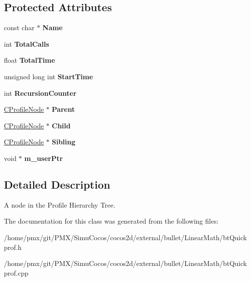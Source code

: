 \subsection*{Protected Attributes}
\begin{DoxyCompactItemize}
\item 
\mbox{\label{classCProfileNode_a1422993bfa989e55ed98d4b1561a127f}} 
const char $\ast$ {\bfseries Name}
\item 
\mbox{\label{classCProfileNode_a2a19e52aa6b96174d010b3c48fccc8cd}} 
int {\bfseries Total\+Calls}
\item 
\mbox{\label{classCProfileNode_a006b92703a98e8c9f238a08749115125}} 
float {\bfseries Total\+Time}
\item 
\mbox{\label{classCProfileNode_a99f6de1d168f7d52a43dac96b43d4cc5}} 
unsigned long int {\bfseries Start\+Time}
\item 
\mbox{\label{classCProfileNode_adf5b1996ba56ff4dfcf3f67549844fa5}} 
int {\bfseries Recursion\+Counter}
\item 
\mbox{\label{classCProfileNode_af23feafd54a172cd1bf933c0f214131b}} 
\hyperlink{classCProfileNode}{C\+Profile\+Node} $\ast$ {\bfseries Parent}
\item 
\mbox{\label{classCProfileNode_a2146538044d6850216802941a22da649}} 
\hyperlink{classCProfileNode}{C\+Profile\+Node} $\ast$ {\bfseries Child}
\item 
\mbox{\label{classCProfileNode_a6eaa2b40d73410007d115e5ec71994f4}} 
\hyperlink{classCProfileNode}{C\+Profile\+Node} $\ast$ {\bfseries Sibling}
\item 
\mbox{\label{classCProfileNode_a1eac2e328f3c94cf5b09ff9d2c0a8ef2}} 
void $\ast$ {\bfseries m\+\_\+user\+Ptr}
\end{DoxyCompactItemize}


\subsection{Detailed Description}
A node in the Profile Hierarchy Tree. 

The documentation for this class was generated from the following files\+:\begin{DoxyCompactItemize}
\item 
/home/pmx/git/\+P\+M\+X/\+Simu\+Cocos/cocos2d/external/bullet/\+Linear\+Math/bt\+Quickprof.\+h\item 
/home/pmx/git/\+P\+M\+X/\+Simu\+Cocos/cocos2d/external/bullet/\+Linear\+Math/bt\+Quickprof.\+cpp\end{DoxyCompactItemize}
